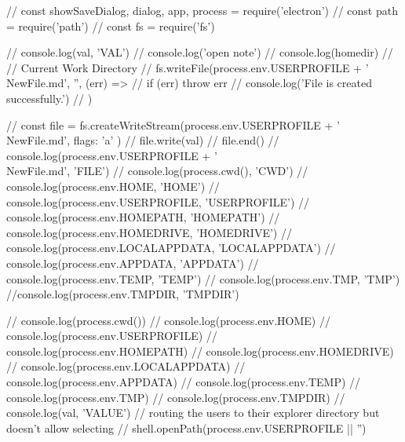 
  // const { showSaveDialog, dialog, app, process } = require('electron')
  // const path = require('path')
  // const fs = require('fs')

  // console.log(val, 'VAL')
  //   console.log('open note')
  //   console.log(homedir)
  //   // Current Work Directory
  //   fs.writeFile(process.env.USERPROFILE + '\\NewFile.md', '', (err) => {
  //     if (err) throw err
  //     console.log('File is created successfully.')
  //   })

  // const file = fs.createWriteStream(process.env.USERPROFILE + '\\NewFile.md', { flags: 'a' })
  // file.write(val)
  // file.end()
  // console.log(process.env.USERPROFILE + '\\NewFile.md', 'FILE')
  // console.log(process.cwd(), 'CWD')
  // console.log(process.env.HOME, 'HOME')
  // console.log(process.env.USERPROFILE, 'USERPROFILE')
  // console.log(process.env.HOMEPATH, 'HOMEPATH')
  // console.log(process.env.HOMEDRIVE, 'HOMEDRIVE')
  // console.log(process.env.LOCALAPPDATA, 'LOCALAPPDATA')
  // console.log(process.env.APPDATA, 'APPDATA')
  // console.log(process.env.TEMP, 'TEMP')
  // console.log(process.env.TMP, 'TMP')
 //console.log(process.env.TMPDIR, 'TMPDIR')
  
  
  

  // console.log(process.cwd())
  // console.log(process.env.HOME)
  // console.log(process.env.USERPROFILE)
  // console.log(process.env.HOMEPATH)
  // console.log(process.env.HOMEDRIVE)
  // console.log(process.env.LOCALAPPDATA)
  // console.log(process.env.APPDATA)
  // console.log(process.env.TEMP)
  // console.log(process.env.TMP)
  // console.log(process.env.TMPDIR)
  // console.log(val, 'VALUE')
  // routing the users to their explorer directory but doesn't allow selecting
  // shell.openPath(process.env.USERPROFILE || '')
  
  
  